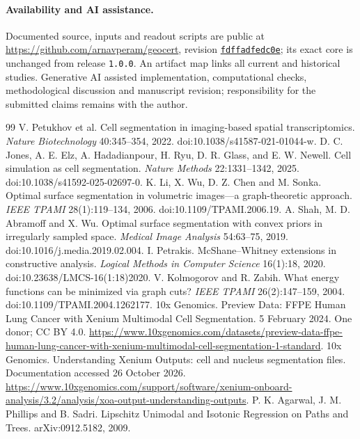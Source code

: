 \documentclass[10pt,letterpaper]{article}
\begin{document}
\paragraph{Availability and AI assistance.}
Documented source, inputs and readout scripts are public at \url{https://github.com/arnavperam/geocert}, revision \href{https://github.com/arnavperam/geocert/tree/fdffadfedc0e21202d554c8425add3349199a766}{\texttt{fdffadfedc0e}}; its exact core is unchanged from release \texttt{1.0.0}. An artifact map links all current and historical studies. Generative AI assisted implementation, computational checks, methodological discussion and manuscript revision; responsibility for the submitted claims remains with the author.

\clearpage
\begin{thebibliography}{99}
 V. Petukhov et al. Cell segmentation in imaging-based spatial transcriptomics. \emph{Nature Biotechnology} 40:345--354, 2022. doi:10.1038/s41587-021-01044-w.
 D. C. Jones, A. E. Elz, A. Hadadianpour, H. Ryu, D. R. Glass, and E. W. Newell. Cell simulation as cell segmentation. \emph{Nature Methods} 22:1331--1342, 2025. doi:10.1038/s41592-025-02697-0.
 K. Li, X. Wu, D. Z. Chen and M. Sonka. Optimal surface segmentation in volumetric images---a graph-theoretic approach. \emph{IEEE TPAMI} 28(1):119--134, 2006. doi:10.1109/TPAMI.2006.19.
 A. Shah, M. D. Abramoff and X. Wu. Optimal surface segmentation with convex priors in irregularly sampled space. \emph{Medical Image Analysis} 54:63--75, 2019. doi:10.1016/j.media.2019.02.004.
 I. Petrakis. McShane--Whitney extensions in constructive analysis. \emph{Logical Methods in Computer Science} 16(1):18, 2020. doi:10.23638/LMCS-16(1:18)2020.
 V. Kolmogorov and R. Zabih. What energy functions can be minimized via graph cuts? \emph{IEEE TPAMI} 26(2):147--159, 2004. doi:10.1109/TPAMI.2004.1262177.
 10x Genomics. Preview Data: FFPE Human Lung Cancer with Xenium Multimodal Cell Segmentation. 5 February 2024. One donor; CC BY 4.0. \url{https://www.10xgenomics.com/datasets/preview-data-ffpe-human-lung-cancer-with-xenium-multimodal-cell-segmentation-1-standard}.
 10x Genomics. Understanding Xenium Outputs: cell and nucleus segmentation files. Documentation accessed 26 October 2026. \url{https://www.10xgenomics.com/support/software/xenium-onboard-analysis/3.2/analysis/xoa-output-understanding-outputs}.
 P. K. Agarwal, J. M. Phillips and B. Sadri. Lipschitz Unimodal and Isotonic Regression on Paths and Trees. arXiv:0912.5182, 2009.

\end{thebibliography}
\end{document}
